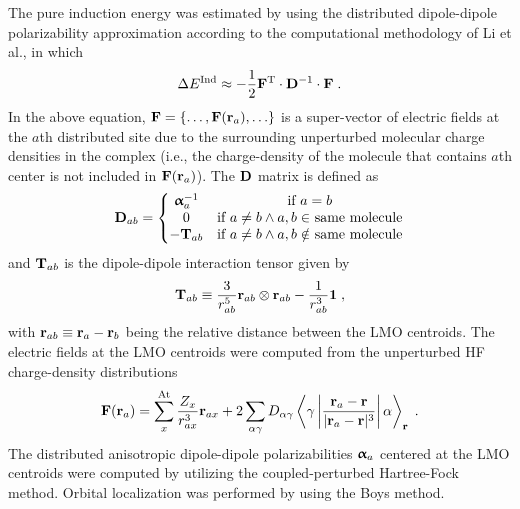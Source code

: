 The pure induction energy was estimated by using the distributed
dipole\hyp{}dipole polarizability approximation according to the computational
methodology of Li et al.,\cite{Li.Netzloff.Gordon.JCP.2006}
in which
%
\begin{equation}\label{e:ind-ref}
 \Delta E^{\rm Ind} \approx - \frac{1}{2} {\bf F}^{\rm T} \cdot {\bf D}^{-1} \cdot {\bf F} \;.
\end{equation}
%
In the above equation, ${\bf F} = \{ \ldots, {\bf F}({\bf r}_a), \ldots\}$
is a super\hyp{}vector of electric fields at the $a$th distributed site
due to the surrounding unperturbed molecular charge densities in the complex
(i.e., the charge\hyp{}density of the molecule that contains $a$th center
is not included in ${\bf F}({\bf r}_a)$).
The ${\bf D}$ matrix is defined as
%
\begin{equation} \label{e:ind-ref.d-matrix}
 {\bf D}_{ab} = 
\left\{\begin{matrix}
{\bm{\upalpha}}_a^{-1} &\text{if $a=b$} \\ 
0                    &\text{if $a\ne b \land a,b \in$ same molecule}\\ 
-{\bf T}_{ab}        &\text{if $a\ne b \land a,b \notin$ same molecule}
\end{matrix}\right.
\end{equation}
%
and ${\bf T}_{ab}$ is the dipole\hyp{}dipole interaction tensor
given by
%
\begin{equation} \label{e:ind-ref.t-matrix}
 {\bf T}_{ab} \equiv \frac{3}{r_{ab}^5} {\bf r}_{ab} \otimes {\bf r}_{ab}
  - \frac{1}{r_{ab}^3} {\bf 1} \;,
\end{equation}
%
with ${\bf r}_{ab} \equiv {\bf r}_{a} - {\bf r}_{b}$ being the
relative distance between the LMO centroids.
The electric fields at the LMO centroids were computed from
the unperturbed HF charge\hyp{}density distributions
%
\begin{equation} \label{e:ind-ref.efield}
 {\bf F}({\bf r}_a) = \sum_x^{\rm At} \frac{Z_x}{r_{ax}^3} {\bf r}_{ax} 
  + 2 \sum_{\alpha\gamma} D_{\alpha\gamma} 
  \left< \gamma \left| 
    \frac{{\bf r}_a - {\bf r}}{\vert {\bf r}_a - {\bf r} \vert^3}
               \right| \alpha \right>_{\bf r} \;.
\end{equation}
%
The distributed anisotropic dipole\hyp{}dipole
polarizabilities ${\bm{\upalpha}}_a$ centered at the LMO centroids
were computed by utilizing the coupled\hyp{}perturbed Hartree\hyp{}Fock
method.\cite{McWeeny.RevModPhys.1960,Dodds.McWeeney.Sadlej.MolPhys.1977} 
Orbital localization was performed by using the Boys method.\cite{Boys.RevModPhys.1960} 

